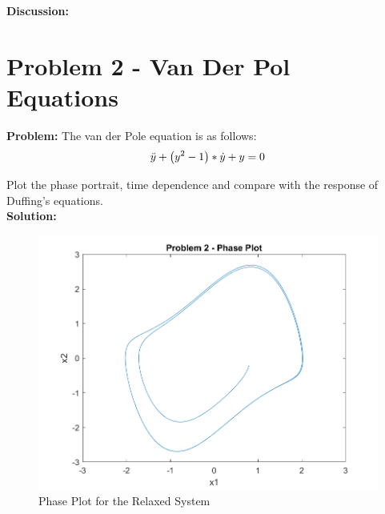 \documentclass[letter]{article}
\begin{document}
\textbf{Discussion:}\\








\newpage
\section{Problem 2 - Van Der Pol Equations}
\textbf{Problem:}
The van der Pole equation is as follows:
\begin{displaymath}
	\ddot{y} + \qty(y^2 - 1)*\dot{y} + y = 0
\end{displaymath}

Plot the phase portrait, time dependence and compare with the response of Duffing's equations.\\

\textbf{Solution:}







\begin{figure}[h]
	\centering
	\includegraphics[width=0.7\linewidth]{fig/pblm2_phase}
	\caption{Phase Plot for the Relaxed System}
	\label{fig:pblm2phase}
\end{figure}
\end{document}
